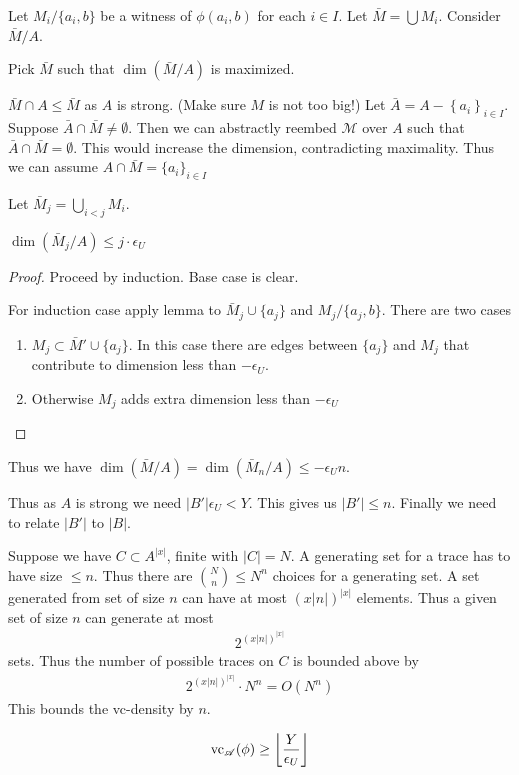 \documentclass{amsart}
\renewcommand{\AA}{\mathscr A}
\newcommand{\M}{\mathcal M}
\newcommand{\curly}[1]{\left\{#1\right\}}
\providecommand{\floor}[1]{\left \lfloor #1 \right \rfloor }
\begin{document}
Let $M_i / \{a_i, b\}$ be a witness of $\phi(a_i, b)$ for each $i \in I$.
Let $\bar M = \bigcup M_i$.
Consider $\bar M / A$.

Pick $\bar M$ such that $\dim(\bar M / A)$ is maximized.

$\bar M \cap A \leq \bar M$ as $A$ is strong. (Make sure $M$ is not too big!)
Let $\bar A = A - \curly{a_i}_{i \in I}$.
Suppose $\bar A \cap \bar M \neq \emptyset$.
Then we can abstractly reembed $\M$ over $A$ such that $\bar A \cap \bar M = \emptyset$.
This would increase the dimension, contradicting maximality.
Thus we can assume $A \cap \bar M = \{a_i\}_{i \in I}$

Let $\bar M_j = \bigcup_{i < j} M_i$.

\begin{Lemma}
	$\dim(\bar M_j / A) \leq j \cdot \epsilon_U$
\end{Lemma}
\begin{proof}
	Proceed by induction.
	Base case is clear.

	For induction case apply lemma to $\bar M_j \cup \{a_j\}$ and $M_j / \{a_j, b\}$.
	There are two cases
	\begin{enumerate}
		\item $M_j \subset \bar M' \cup \{a_j\}$.
		In this case there are edges between $\{a_j\}$ and $M_j$ that contribute to dimension less than $-\epsilon_U$.
		\item Otherwise $M_j$ adds extra dimension less than $-\epsilon_U$
	\end{enumerate}
\end{proof}

Thus we have $\dim(\bar M / A) = \dim(\bar M_n / A) \leq -\epsilon_U n$.

Thus as $A$ is strong we need $|B'| \epsilon_U < Y$.
This gives us $|B'| \leq n$.
Finally we need to relate $|B'|$ to $|B|$.

Suppose we have $C \subset A^{|x|}$, finite with $|C| = N$.
A generating set for a trace has to have size $\leq n$.
Thus there are ${N \choose n} \leq N^n$ choices for a generating set.
A set generated from set of size $n$ can have at most $(x|n|)^{|x|}$ elements.
Thus a given set of size $n$ can generate at most
\begin{align*}
	2^{(x|n|)^{|x|}}
\end{align*}
sets.
Thus the number of possible traces on $C$ is bounded above by
\begin{align*}
  2^{(x|n|)^{|x|}} \cdot N^n = O(N^n)
\end{align*}
This bounds the vc-density by $n$.

\begin{align*}
	\vc_\AA(\phi) \geq \floor{\frac{Y}{\epsilon_U}}
\end{align*}
\end{document}
